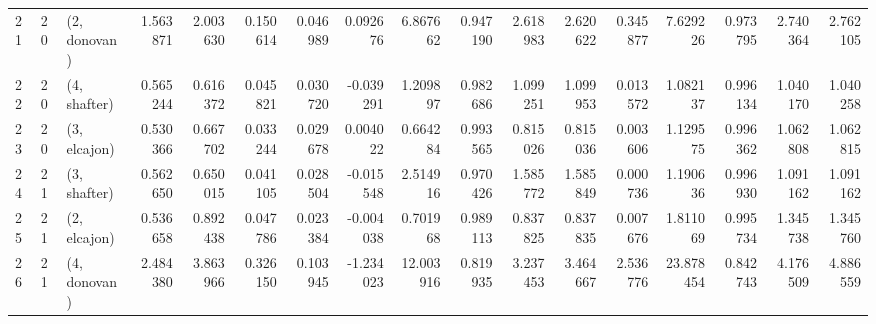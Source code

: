 \begin{tabular}{lllrrrrrrrrrrrrrr}
21 &    20 &  (2, donovan) &  1.563871 &  2.003630 &   0.150614 &  0.046989 &  0.092676 &   6.867662 &  0.947190 &   2.618983 &  2.620622 &  0.345877 &   7.629226 &  0.973795 &  2.740364 &  2.762105 \\
22 &    20 &  (4, shafter) &  0.565244 &  0.616372 &   0.045821 &  0.030720 & -0.039291 &   1.209897 &  0.982686 &   1.099251 &  1.099953 &  0.013572 &   1.082137 &  0.996134 &  1.040170 &  1.040258 \\
23 &    20 &  (3, elcajon) &  0.530366 &  0.667702 &   0.033244 &  0.029678 &  0.004022 &   0.664284 &  0.993565 &   0.815026 &  0.815036 &  0.003606 &   1.129575 &  0.996362 &  1.062808 &  1.062815 \\
24 &    21 &  (3, shafter) &  0.562650 &  0.650015 &   0.041105 &  0.028504 & -0.015548 &   2.514916 &  0.970426 &   1.585772 &  1.585849 &  0.000736 &   1.190636 &  0.996930 &  1.091162 &  1.091162 \\
25 &    21 &  (2, elcajon) &  0.536658 &  0.892438 &   0.047786 &  0.023384 & -0.004038 &   0.701968 &  0.989113 &   0.837825 &  0.837835 &  0.007676 &   1.811069 &  0.995734 &  1.345738 &  1.345760 \\
26 &    21 &  (4, donovan) &  2.484380 &  3.863966 &   0.326150 &  0.103945 & -1.234023 &  12.003916 &  0.819935 &   3.237453 &  3.464667 &  2.536776 &  23.878454 &  0.842743 &  4.176509 &  4.886559 \\
\bottomrule
\end{tabular}
